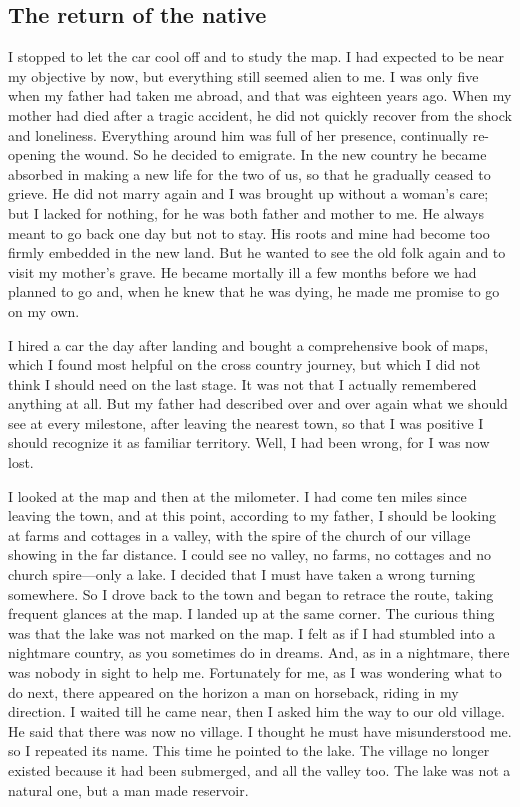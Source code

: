 \documentclass[11pt]{article}
\begin{document}
\subsection{The return of the native}
\label{sec-1-57}

I stopped to let the car cool off and to study the map. I had expected to be near my objective by now, but everything still seemed alien to me. I was only five when my father had taken me abroad, and that was eighteen years ago. When my mother had died after a tragic accident, he did not quickly recover from the shock and loneliness. Everything around him was full of her presence, continually re-opening the wound. So he decided to emigrate. In the new country he became absorbed in making a new life for the two of us, so that he gradually ceased to grieve. He did not marry again and I was brought up without a woman's care; but I lacked for nothing, for he was both father and mother to me. He always meant to go back one day but not to stay. His roots and mine had become too firmly embedded in the new land. But he wanted to see the old folk again and to visit my mother's grave. He became mortally ill a few months before we had planned to go and, when he knew that he was dying, he made me promise to go on my own.

I hired a car the day after landing and bought a comprehensive book of maps, which I found most helpful on the cross country journey, but which I did not think I should need on the last stage. It was not that I actually remembered anything at all. But my father had described over and over again what we should see at every milestone, after leaving the nearest town, so that I was positive I should recognize it as familiar territory. Well, I had been wrong, for I was now lost.

I looked at the map and then at the milometer. I had come ten miles since leaving the town, and at this point, according to my father, I should be looking at farms and cottages in a valley, with the spire of the church of our village showing in the far distance. I could see no valley, no farms, no cottages and no church spire---only a lake. I decided that I must have taken a wrong turning somewhere. So I drove back to the town and began to retrace the route, taking frequent glances at the map. I landed up at the same corner. The curious thing was that the lake was not marked on the map. I felt as if I had stumbled into a nightmare country, as you sometimes do in dreams. And, as in a nightmare, there was nobody in sight to help me. Fortunately for me, as I was wondering what to do next, there appeared on the horizon a man on horseback, riding in my direction. I waited till he came near, then I asked him the way to our old village. He said that there was now no village. I thought he must have misunderstood me. so I repeated its name. This time he pointed to the lake. The village no longer existed because it had been submerged, and all the valley too. The lake was not a natural one, but a man made reservoir. 
\end{document}
